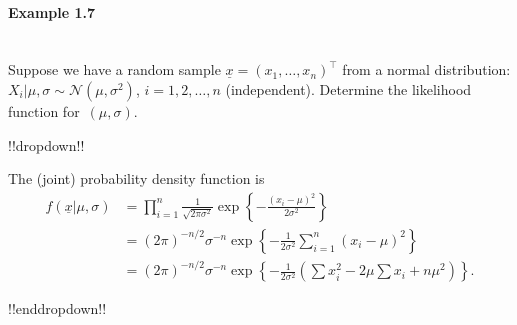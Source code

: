 \paragraph{Example 1.7}{~\\
Suppose we have a random sample $\underline{x} = (x_1, \ldots, x_n)^\top$ from a normal distribution: $X_i|\mu,\sigma\sim \mathcal{N}(\mu,\sigma^2)$, $i=1,2,\ldots,n$ (independent). Determine the likelihood function for~$(\mu,\sigma)$.

!!dropdown!!

The (joint) probability density function is
        \begin{align*}
        f(\underline{x}|\mu,\sigma)
        &=\prod_{i=1}^n \frac{1}{\sqrt{2\pi\sigma^2}}
        \exp\left\{-\frac{(x_i-\mu)^2}{2\sigma^2}\right\} \\
        &=(2\pi)^{-n/2}\sigma^{-n}
        \exp\left\{-\frac{1}{2\sigma^2}\sum_{i=1}^n (x_i-\mu)^2\right\} \\
        &=(2\pi)^{-n/2}\sigma^{-n}
        \exp\left\{-\frac{1}{2\sigma^2}
        \left(\sum x_i^2-2\mu\sum x_i+n\mu^2\right)\right\}.
        \end{align*}

!!enddropdown!!}






























































